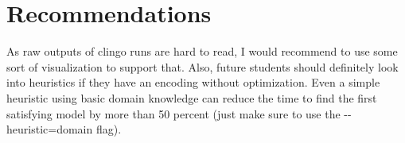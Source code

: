 \documentclass{llncs}
\begin{document}
\section{Recommendations}
As raw outputs of clingo runs are hard to read, I would recommend to use some sort of visualization to support that. Also, future students should definitely look into heuristics if they have an encoding without optimization. Even a simple heuristic using basic domain knowledge can reduce the time to find the first satisfying model by more than 50 percent (just make sure to use the {-}{-}heuristic=domain flag).  
\end{document}
